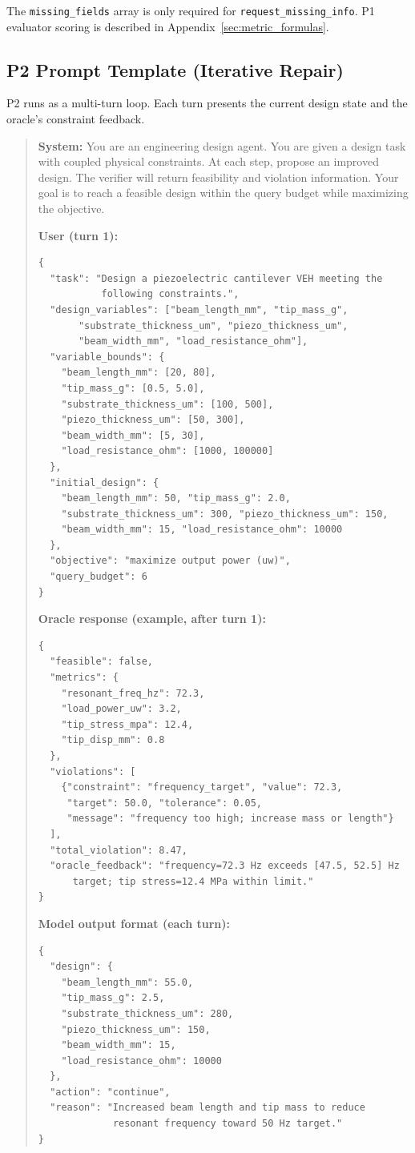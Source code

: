 The \texttt{missing\_fields} array is only required for \texttt{request\_missing\_info}. P1 evaluator scoring is described in Appendix~\ref{sec:metric_formulas}.

\subsection{P2 Prompt Template (Iterative Repair)}

P2 runs as a multi-turn loop. Each turn presents the current design state and the oracle's constraint feedback.

\begin{quote}
\footnotesize
\textbf{System:} You are an engineering design agent. You are given a design task with coupled physical constraints. At each step, propose an improved design. The verifier will return feasibility and violation information. Your goal is to reach a feasible design within the query budget while maximizing the objective.

\textbf{User (turn 1):}
\begin{verbatim}
{
  "task": "Design a piezoelectric cantilever VEH meeting the
           following constraints.",
  "design_variables": ["beam_length_mm", "tip_mass_g",
       "substrate_thickness_um", "piezo_thickness_um",
       "beam_width_mm", "load_resistance_ohm"],
  "variable_bounds": {
    "beam_length_mm": [20, 80],
    "tip_mass_g": [0.5, 5.0],
    "substrate_thickness_um": [100, 500],
    "piezo_thickness_um": [50, 300],
    "beam_width_mm": [5, 30],
    "load_resistance_ohm": [1000, 100000]
  },
  "initial_design": {
    "beam_length_mm": 50, "tip_mass_g": 2.0,
    "substrate_thickness_um": 300, "piezo_thickness_um": 150,
    "beam_width_mm": 15, "load_resistance_ohm": 10000
  },
  "objective": "maximize output power (uw)",
  "query_budget": 6
}
\end{verbatim}

\textbf{Oracle response (example, after turn 1):}
\begin{verbatim}
{
  "feasible": false,
  "metrics": {
    "resonant_freq_hz": 72.3,
    "load_power_uw": 3.2,
    "tip_stress_mpa": 12.4,
    "tip_disp_mm": 0.8
  },
  "violations": [
    {"constraint": "frequency_target", "value": 72.3,
     "target": 50.0, "tolerance": 0.05,
     "message": "frequency too high; increase mass or length"}
  ],
  "total_violation": 8.47,
  "oracle_feedback": "frequency=72.3 Hz exceeds [47.5, 52.5] Hz
      target; tip stress=12.4 MPa within limit."
}
\end{verbatim}

\textbf{Model output format (each turn):}
\begin{verbatim}
{
  "design": {
    "beam_length_mm": 55.0,
    "tip_mass_g": 2.5,
    "substrate_thickness_um": 280,
    "piezo_thickness_um": 150,
    "beam_width_mm": 15,
    "load_resistance_ohm": 10000
  },
  "action": "continue",
  "reason": "Increased beam length and tip mass to reduce
             resonant frequency toward 50 Hz target."
}
\end{verbatim}
\end{quote}

